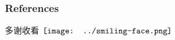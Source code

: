 \documentclass[16pt]{beamer}
\newcommand{\cc}[2]{#1}
\newcommand{\cc}[2]{#2}
\newcommand{\smiley}{$\vcenter{\hbox{\texttt{[image: ../smiling-face.png]}}}$}
\begin{document}
\begin{frame} %
\frametitle{References}
\cc{多谢收看}{Thanks for watching} \smiley \\
\nocite{Goldblatt1984}
\nocite{MacLane1992}
\nocite{Streicher2006}
\nocite{Awodey2006}
\nocite{Jacobs1999}
\nocite{Abramsky2011}
\nocite{Caramello2018}
\nocite{Lawvere1997}
\nocite{Lawvere2003}
\nocite{Rodin2014}
\nocite{Vickers1989}
\nocite{Pitts1991}
\nocite{Sorensen2006}

\printbibliography
\end{frame}
\end{document}
